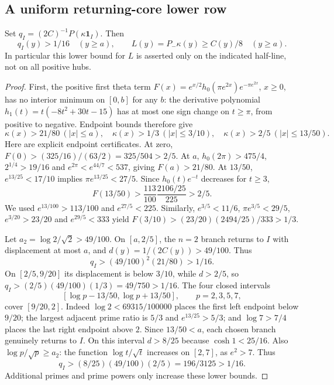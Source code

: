\subsection{A uniform returning-core lower row}
\begin{lemma}\label{lem:dep-lower-left}
Set $q_I=(2C)^{-1}P(\kappa\mathbf1_I)$. Then
\[
 q_I(y)>1/16\quad (y\ge a),\qquad
 L(y)=P_-\kappa(y)\ge C(y)/8\quad (y\ge a).
\]
In particular this lower bound for $L$ is asserted only on the indicated
half-line, not on all positive hubs.
\end{lemma}
\begin{proof}
First, the positive first theta term
$F(x)=e^{x/2}h_0(\pi e^{2x})e^{-\pi e^{2x}}$, $x\ge0$,
has no interior minimum on $[0,b]$ for any $b$: the derivative polynomial
$h_1(t)=t(-8t^2+30t-15)$ has at most one sign change on $t\ge\pi$,
from positive to negative. Endpoint bounds therefore give
\begin{equation}\label{eq:dep-local-lower}
 \kappa(x)>21/80\ (|x|\le a),\quad
 \kappa(x)>1/3\ (|x|\le3/10),\quad
 \kappa(x)>2/5\ (|x|\le13/50).
\end{equation}
Here are explicit endpoint certificates. At zero,
$F(0)>(325/16)/(63/2)=325/504>2/5$.
At $a$, $h_0(2\pi)>475/4$, $2^{1/4}>19/16$ and
$e^{2\pi}<e^{44/7}<537$, giving $F(a)>21/80$.
At $13/50$, $e^{13/25}<17/10$ implies
$\pi e^{13/25}<27/5$. Since $h_0(t)e^{-t}$ decreases for $t\ge3$,
\[
 F(13/50)>\frac{113}{100}\frac{2106/25}{225}>2/5.
\]
We used $e^{13/100}>113/100$ and $e^{27/5}<225$.
Similarly, $e^{3/5}<11/6$, $\pi e^{3/5}<29/5$,
$e^{3/20}>23/20$ and $e^{29/5}<333$ yield
$F(3/10)>(23/20)(2494/25)/333>1/3$.

Let $a_2=\log2/\sqrt2>49/100$. On $[a,2/5]$, the $n=2$ branch
returns to $I$ with displacement at most $a$, and
$d(y)=1/(2C(y))>49/100$. Thus
\[
 q_I>(49/100)^2(21/80)>1/16.
\]
On $[2/5,9/20]$ its displacement is below $3/10$, while $d>2/5$,
so $q_I>(2/5)(49/100)(1/3)=49/750>1/16$.
The four closed intervals
\[
 [\log p-13/50,\log p+13/50],\qquad p=2,3,5,7,
\]
cover $[9/20,2]$. Indeed $\log2<69315/100000$ places the first
left endpoint below $9/20$; the largest adjacent prime ratio is $5/3$
and $e^{13/25}>5/3$; and $\log7>7/4$ places the last right endpoint
above $2$. Since $13/50<a$, each chosen branch genuinely returns to $I$.
On this interval $d>8/25$ because $\cosh1<25/16$.
Also $\log p/\sqrt p\ge a_2$: the function $\log t/\sqrt t$ increases
on $[2,7]$, as $e^2>7$. Thus
\[
 q_I>(8/25)(49/100)(2/5)=196/3125>1/16.
\]
Additional primes and prime powers only increase these lower bounds.


\end{proof}

